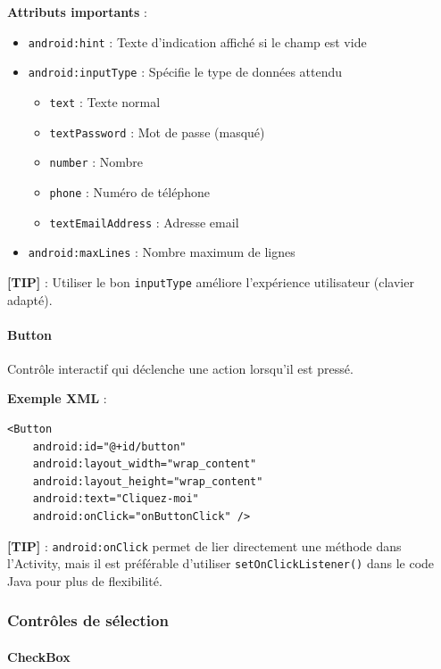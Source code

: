 \documentclass[11pt,a4paper]{article}
\begin{document}
\textbf{Attributs importants} :
\begin{itemize}
    \item \texttt{android:hint} : Texte d'indication affiché si le champ est vide
    \item \texttt{android:inputType} : Spécifie le type de données attendu
    \begin{itemize}
        \item \texttt{text} : Texte normal
        \item \texttt{textPassword} : Mot de passe (masqué)
        \item \texttt{number} : Nombre
        \item \texttt{phone} : Numéro de téléphone
        \item \texttt{textEmailAddress} : Adresse email
    \end{itemize}
    \item \texttt{android:maxLines} : Nombre maximum de lignes
\end{itemize}

\textbf{[TIP]} : Utiliser le bon \texttt{inputType} améliore l'expérience utilisateur (clavier adapté).

\paragraph{Button}

Contrôle interactif qui déclenche une action lorsqu'il est pressé.

\textbf{Exemple XML} :
\begin{lstlisting}[style=XML]
<Button
    android:id="@+id/button"
    android:layout_width="wrap_content"
    android:layout_height="wrap_content"
    android:text="Cliquez-moi"
    android:onClick="onButtonClick" />
\end{lstlisting}

\textbf{[TIP]} : \texttt{android:onClick} permet de lier directement une méthode dans l'Activity, mais il est préférable d'utiliser \texttt{setOnClickListener()} dans le code Java pour plus de flexibilité.

\subsubsection{Contrôles de sélection}

\paragraph{CheckBox}
\end{document}
